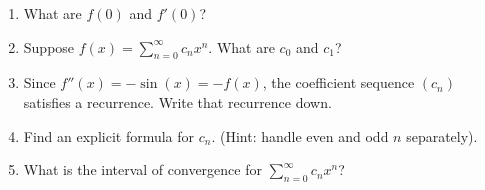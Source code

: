 \documentclass{article}
\begin{document}
\begin{enumerate}

	\item What are $f(0)$ and $f'(0)$?

	\item Suppose $\displaystyle f(x) = \sum_{n = 0}^\infty c_n x^n$. What are $c_0$ and $c_1$?

	\item Since $f''(x) = -\sin(x) = -f(x)$, the coefficient sequence $(c_n)$ satisfies a recurrence. Write that recurrence down.

	\item Find an explicit formula for $c_n$. (Hint: handle even and odd $n$ separately).

	\item What is the interval of convergence for $\displaystyle \sum_{n = 0}^\infty c_n x^n$?

\end{enumerate}
\end{document}
